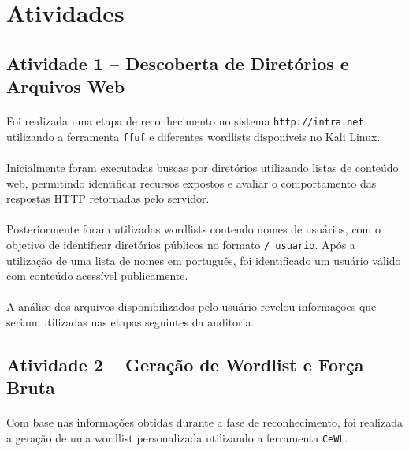 \section{Atividades}

\subsection{Atividade 1 -- Descoberta de Diretórios e Arquivos Web}

\paragraph{}
Foi realizada uma etapa de reconhecimento no sistema \texttt{http://intra.net}
utilizando a ferramenta \texttt{ffuf} e diferentes wordlists disponíveis no
Kali Linux.

\paragraph{}
Inicialmente foram executadas buscas por diretórios utilizando listas de
conteúdo web, permitindo identificar recursos expostos e avaliar o
comportamento das respostas HTTP retornadas pelo servidor.

\paragraph{}
Posteriormente foram utilizadas wordlists contendo nomes de usuários, com o
objetivo de identificar diretórios públicos no formato \texttt{/~usuario}. Após
a utilização de uma lista de nomes em português, foi identificado um usuário
válido com conteúdo acessível publicamente.

\paragraph{}
A análise dos arquivos disponibilizados pelo usuário revelou informações que
seriam utilizadas nas etapas seguintes da auditoria.

\subsection{Atividade 2 -- Geração de Wordlist e Força Bruta}

\paragraph{}
Com base nas informações obtidas durante a fase de reconhecimento, foi
realizada a geração de uma wordlist personalizada utilizando a ferramenta
\texttt{CeWL}.

